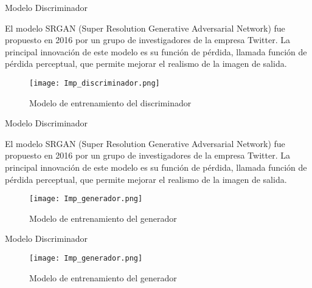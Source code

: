 \begin{frame}{Modelo Discriminador}
    

    El modelo SRGAN (Super Resolution Generative Adversarial Network) fue
    propuesto en 2016 por un grupo de investigadores de la empresa Twitter.
    La principal innovación de este modelo es su función de pérdida, llamada
    función de pérdida perceptual, que permite mejorar el realismo de la imagen de
    salida.

        
    \begin{figure}[H]
        \begin{center}
          \texttt{[image: Imp\_discriminador.png]}
          \caption{Modelo de entrenamiento del discriminador}
          \label{Alexis3}
        \end{center}
    \end{figure}
     

\end{frame}

\begin{frame}{Modelo Discriminador}
    

    El modelo SRGAN (Super Resolution Generative Adversarial Network) fue
    propuesto en 2016 por un grupo de investigadores de la empresa Twitter.
    La principal innovación de este modelo es su función de pérdida, llamada
    función de pérdida perceptual, que permite mejorar el realismo de la imagen de
    salida.

        
    \begin{figure}[H]
        \begin{center}
          \texttt{[image: Imp\_generador.png]}
          \caption{Modelo de entrenamiento del generador}
          \label{Alexis4}
        \end{center}
    \end{figure}
     

\end{frame}



\begin{frame}{Modelo Discriminador}
    

        
    \begin{figure}[H]
        \begin{center}
          \texttt{[image: Imp\_generador.png]}
          \caption{Modelo de entrenamiento del generador}
          \label{Alexis5}
        \end{center}
    \end{figure}
     

\end{frame}


